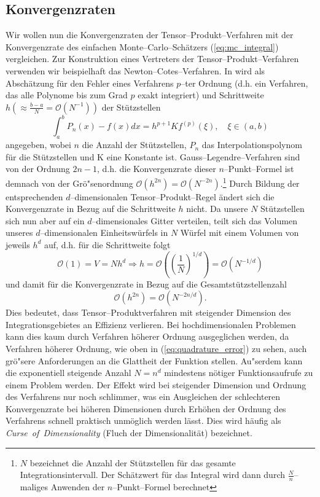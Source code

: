 	\subsection{Konvergenzraten}\label{subsec:integrationsproblem_comparison}
	Wir wollen nun die Konvergenzraten der Tensor--Produkt--Verfahren mit der Konvergenzrate des einfachen Monte--Carlo--Schätzers (\ref{eq:mc_integral}) vergleichen. Zur Konstruktion eines Vertreters der Tensor--Produkt--Verfahren verwenden wir beispielhaft das Newton--Cotes--Verfahren. In \citep[][3.1.4]{Stoer:2005p10586} wird als Ab\-schät\-zung für den Fehler eines Verfahrens $p$--ter Ordnung (d.h. ein Verfahren, das alle Polynome bis zum Grad $p$ exakt integriert) und Schrittweite $h(\approx\frac{b-a}{N}=\mathcal{O}(N^{-1}))$ der Stützstellen
	\begin{equation}
		\int_a^b P_n(x)-f(x)dx=h^{p+1}K f^{(p)}(\xi),\quad\xi\in(a,b)
		\label{eq:quadrature_error}
	\end{equation}
	angegeben, wobei $n$ die Anzahl der Stützstellen, $P_n$ das Interpolationspolynom für die Stützstellen und K eine Konstante ist. Gauss--Legendre--Verfahren sind von der Ordnung $2n-1$, d.h. die Konvergenzrate dieser $n$--Punkt--Formel ist demnach von der Grö"senordnung $\mathcal{O}(h^{2n})=\mathcal{O}(N^{-2n})$.\footnote{$N$ bezeichnet die Anzahl der Stützstellen für das gesamte Integrationsintervall. Der Schätzwert für das Integral wird dann durch $\frac{N}{n}$--maliges Anwenden der $n$--Punkt--Formel berechnet}
	Durch Bildung der entsprechenden $d$--dimensionalen Tensor--Produkt--Regel ändert sich die Konvergenzrate in Bezug auf die Schrittweite $h$ nicht. Da unsere $N$ Stützstellen sich nun aber auf ein $d$--dimensionales Gitter verteilen, teilt sich das Volumen unseres $d$--dimensionalen Einheitswürfels in $N$ Würfel mit einem Volumen von jeweils $h^d$ auf, d.h. für die Schrittweite folgt
	$$\mathcal{O}(1)=V=N h^d \Rightarrow h=\mathcal{O}\left(\left(\frac{1}{N}\right)^{1/d}\right)=\mathcal{O}\left(N^{-1/d}\right)$$	
	und damit für die Konvergenzrate in Bezug auf die Gesamtstützstellenzahl
	$$\mathcal{O}(h^{2n})=\mathcal{O}(N^{-2n/d}).$$
	Dies bedeutet, dass Tensor--Produktverfahren mit steigender Dimension des Integrationsgebietes an Effizienz verlieren. Bei hochdimensionalen Problemen kann dies kaum durch Verfahren höherer Ordnung ausgeglichen werden, da Verfahren höherer Ordnung, wie oben in (\ref{eq:quadrature_error}) zu sehen, auch grö"sere Anforderungen an die Glattheit der Funktion stellen. Au"serdem kann die exponentiell steigende Anzahl $N=n^d$ mindestens nötiger Funktionsaufrufe zu einem Problem werden. Der Effekt wird bei steigender Dimension und Ordnung des Verfahrens nur noch schlimmer, was ein Ausgleichen der schlechteren Konvergenzrate bei höheren Dimensionen durch Erhöhen der Ordnung des Verfahrens schnell praktisch unmöglich werden lässt. Dies wird häufig als {\em Curse~of~Dimensionality} (Fluch der Dimensionalität) bezeichnet.
	
